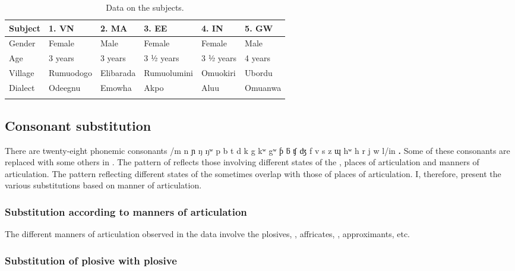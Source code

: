 \documentclass[output=paper,
modfonts
]{langscibook}
\begin{document}
\begin{table}
\begin{tabularx}{\textwidth}{lXXXXX}
\lsptoprule
Subject & 1. VN & 2. MA & 3. EE & 4. IN & 5. GW\\
\midrule
Gender & Female & Male & Female & Female & Male \\
Age & 3 years & 3 years & 3 ½ years & 3 ½ years & 4 years\\
Village & Rumuodogo & Elibarada & Rumuolumini & Omuokiri & Ubordu \\
Dialect & Odeegnu & Emowha & {Akpo} & {Aluu} & {Omuanwa}\\
\lspbottomrule
\end{tabularx}
\caption{Data on the subjects.}
\label{tab:alerechi:8}
\end{table}

\subsection{Consonant substitution}\label{sec:alerechi:1.7}

There are twenty-eight phonemic consonants /m n ɲ ŋ ŋʷ p b t d k g kʷ gʷ ƥ ƃ ʧ ʤ f v s z ɰ hʷ h r j w l/in \textbf{. }Some of these consonants are replaced with some others in . The pattern of  reflects those involving different states of the , places of articulation and manners of articulation. The pattern reflecting different states of the  sometimes overlap with those of places of articulation. I, therefore, present the various substitutions based on manner of articulation.

\subsubsection{Substitution according to manners of articulation}\label{sec:alerechi:1.7.1}

The different manners of articulation observed in the data involve the plosives, , affricates, , approximants, etc. 

\subsubsection{Substitution of plosive with plosive}\label{sec:alerechi:1.7.2}
\end{document}

